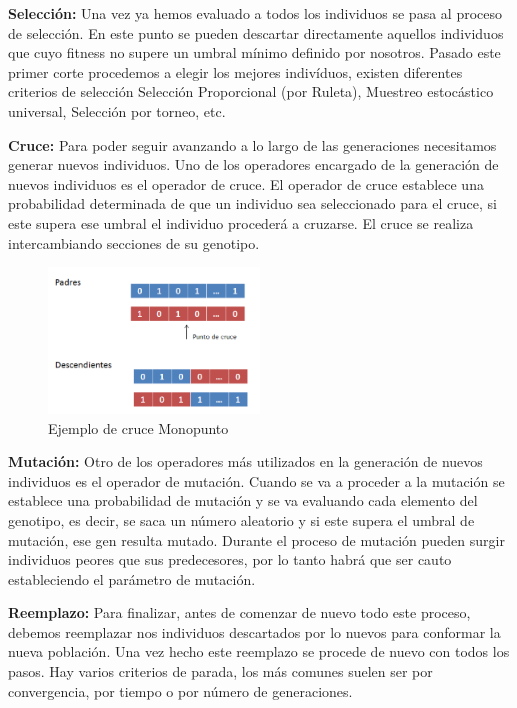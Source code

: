 \textbf{Selección:} Una vez ya hemos evaluado a todos los individuos se pasa al proceso de selección. En este punto se pueden descartar directamente aquellos individuos que cuyo fitness no supere un umbral mínimo definido por nosotros. Pasado este primer corte procedemos a elegir los mejores indivíduos, existen diferentes criterios de selección Selección Proporcional (por Ruleta), Muestreo estocástico universal, Selección por torneo, etc.

\textbf{Cruce:} Para poder seguir avanzando a lo largo de las generaciones necesitamos generar nuevos individuos. Uno de los operadores encargado de la generación de nuevos individuos es el operador de cruce. El operador de cruce establece una probabilidad determinada de que un individuo sea seleccionado para el cruce, si este supera ese umbral el individuo procederá a cruzarse. El cruce se realiza intercambiando secciones de su genotipo.

\begin{figure}[h]
  \centering
  \includegraphics[width=0.5\textwidth]{../img/cruce_monopunto}\caption{Ejemplo de cruce Monopunto}
\end{figure}



\textbf{Mutación:} Otro de los operadores más utilizados en la generación de nuevos individuos es el operador de mutación. Cuando se va a proceder a la mutación se establece una probabilidad de mutación y se va evaluando cada elemento del genotipo, es decir, se saca un número aleatorio y si este supera el umbral de mutación, ese gen resulta mutado. Durante el proceso de mutación pueden surgir individuos peores que sus predecesores, por lo tanto habrá que ser cauto estableciendo el parámetro de mutación.

\textbf{Reemplazo:} Para finalizar, antes de comenzar de nuevo todo este proceso, debemos reemplazar nos individuos descartados por lo nuevos para conformar la nueva población. Una vez hecho este reemplazo se procede de nuevo con todos los pasos. Hay varios criterios de parada, los más comunes suelen ser por convergencia, por tiempo o por número de generaciones.




